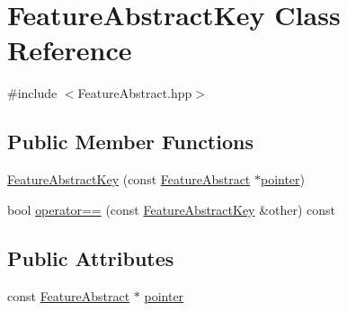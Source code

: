 \hypertarget{class_feature_abstract_key}{\section{Feature\+Abstract\+Key Class Reference}
\label{class_feature_abstract_key}
}


{\ttfamily \#include $<$Feature\+Abstract.\+hpp$>$}

\subsection*{Public Member Functions}
\begin{DoxyCompactItemize}
\item 
\hyperlink{class_feature_abstract_key_a10cead64ab9d20ea4eb06a5dbdd6fea1}{Feature\+Abstract\+Key} (const \hyperlink{class_feature_abstract}{Feature\+Abstract} $\ast$\hyperlink{class_feature_abstract_key_a45ece81d4ec1846f38e62318441cb185}{pointer})
\item 
bool \hyperlink{class_feature_abstract_key_af2a090e2b5859801c5f28df84b04b90b}{operator==} (const \hyperlink{class_feature_abstract_key}{Feature\+Abstract\+Key} \&other) const 
\end{DoxyCompactItemize}
\subsection*{Public Attributes}
\begin{DoxyCompactItemize}
\item 
const \hyperlink{class_feature_abstract}{Feature\+Abstract} $\ast$ \hyperlink{class_feature_abstract_key_a45ece81d4ec1846f38e62318441cb185}{pointer}
\end{DoxyCompactItemize}


